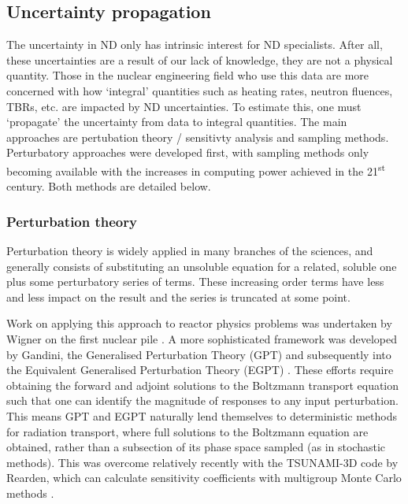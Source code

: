 
\subsection{Uncertainty propagation}
The uncertainty in ND only has intrinsic interest for ND specialists. After all, these uncertainties are a result of our lack of knowledge, they are not a physical quantity. Those in the nuclear engineering field who use this data are more concerned with how `integral' quantities such as heating rates, neutron fluences, TBRs, etc. are impacted by ND uncertainties. To estimate this, one must `propagate' the uncertainty from data to integral quantities. The main approaches are pertubation theory / sensitivty analysis and sampling methods. Perturbatory approaches were developed first, with sampling methods only becoming available with the increases in computing power achieved in the 21\textsuperscript{st} century. Both methods are detailed below.
\subsubsection{Perturbation theory}
Perturbation theory is widely applied in many branches of the sciences, and generally consists of substituting an unsoluble equation for a related, soluble one plus some perturbatory series of terms. These increasing order terms have less and less impact on the result and the series is truncated at some point. 

Work on applying this approach to reactor physics problems was undertaken by Wigner on the first nuclear pile \cite{Rising2012}. A more sophisticated framework was developed by Gandini, the Generalised Perturbation Theory (GPT) \cite{Gandini1967} and subsequently into the Equivalent Generalised Perturbation Theory (EGPT) \cite{Gandini1986}. These efforts require obtaining the forward and adjoint solutions to the Boltzmann transport equation such that one can identify the magnitude of responses to any input perturbation. This means GPT and EGPT naturally lend themselves to deterministic methods for radiation transport, where full solutions to the Boltzmann equation are obtained, rather than a subsection of its phase space sampled (as in stochastic methods). This was overcome relatively recently with the TSUNAMI-3D code by Rearden, which can calculate sensitivity coefficients with multigroup Monte Carlo methods \cite{Rearden2004}. 

